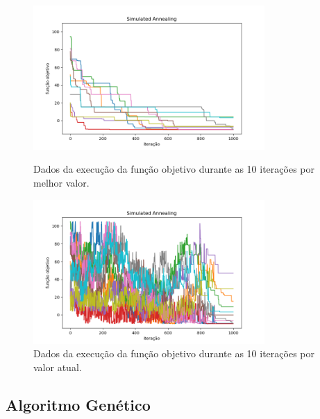 \begin{figure}[H]
\centering
  \begin{minipage}[b]{0.48\textwidth}
    \includegraphics[width=88mm]{imagens/otima/problema-1-simulated-annealing-funcao-objetivo-best.png}
    \caption{Dados da execução da função objetivo durante as 10 iterações por melhor valor.
    \label{fig:problema-1-simulated-annealing-funcao-objetivo-best}}
  \end{minipage}
  \hfill
  \begin{minipage}[b]{0.48\textwidth}
    \includegraphics[width=88mm]{imagens/otima/problema-1-simulated-annealing-funcao-objetivo-value.png}
    \caption{Dados da execução da função objetivo durante as 10 iterações por valor atual.
    \label{fig:problema-1-simulated-annealing-funcao-objetivo-value}}
  \end{minipage}
\end{figure}

\subsection{Algoritmo Genético}

